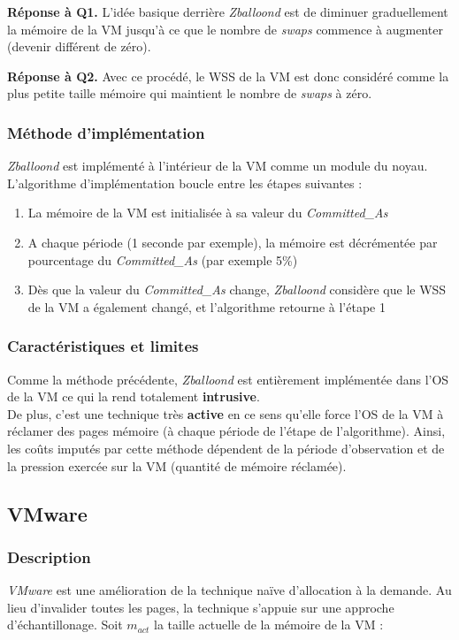 \par{\textbf{Réponse à Q1.}} L'idée basique derrière \emph{Zballoond} est de diminuer graduellement la mémoire de la VM jusqu'à ce que le nombre de \textit{swaps} commence à augmenter (devenir différent de zéro).

\par{\textbf{Réponse à Q2.}} Avec ce procédé, le WSS de la VM est donc considéré comme la plus petite taille mémoire qui maintient le nombre de \textit{swaps} à zéro.

\subsubsection{Méthode d'implémentation}
\textit{Zballoond} est implémenté à l'intérieur de la VM comme un module du noyau. L'algorithme d'implémentation boucle entre les étapes suivantes : 
\begin{enumerate}[label=\textbf{(\roman*)}]
    \item La mémoire de la VM est initialisée à sa valeur du \textit{Committed\_As}
    \item A chaque période (1 seconde par exemple), la mémoire est décrémentée par pourcentage du \textit{Committed\_As} (par exemple 5\%)
    \item Dès que la valeur du \textit{Committed\_As} change, \textit{Zballoond} considère que le WSS de la VM a également changé, et l'algorithme retourne à l'étape 1
\end{enumerate}

\subsubsection{Caractéristiques et limites}
Comme la méthode précédente, \textit{Zballoond} est entièrement implémentée dans l'OS de la VM ce qui la rend totalement \textbf{intrusive}.\\ 
De plus, c'est une technique très \textbf{active} en ce sens qu'elle force l'OS de la VM à réclamer des pages mémoire (à chaque période de l'étape de l'algorithme). Ainsi, les coûts imputés par cette méthode dépendent de la période d'observation et de la pression exercée sur la VM (quantité de mémoire réclamée).

\subsection{VMware}

\subsubsection{Description}
\textit{VMware} \cite{article10} est une amélioration de la technique naïve d'allocation à la demande. Au lieu d'invalider toutes les pages, la technique s'appuie sur une approche d'échantillonage. Soit $\textit{m}_\textit{act}$ la taille actuelle de la mémoire de la VM :

